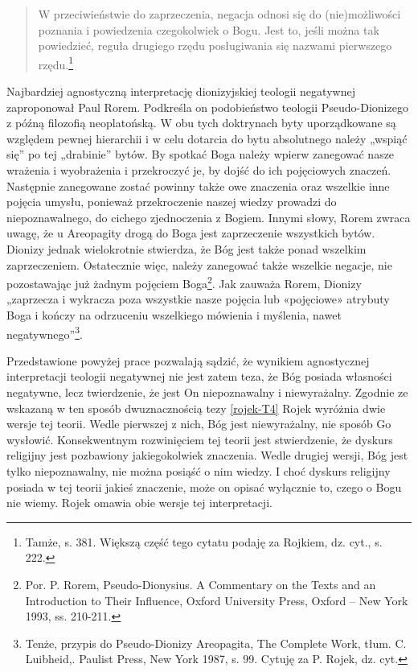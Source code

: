 \begin{quote}
        W przeciwieństwie do zaprzeczenia, negacja odnosi się do (nie)możliwości
poznania i powiedzenia czegokolwiek o Bogu. Jest to, jeśli można tak
powiedzieć, reguła drugiego rzędu posługiwania się nazwami pierwszego
rzędu.\footnote{Tamże, s. 381. Większą część tego cytatu podaję za
Rojkiem, dz. cyt., s. 222. }
\end{quote}






Najbardziej agnostyczną interpretację dionizyjskiej teologii negatywnej
zaproponował Paul Rorem. Podkreśla on podobieństwo teologii
Pseudo-Dionizego z późną filozofią neoplatońską. W obu tych doktrynach
byty uporządkowane są względem pewnej hierarchii i w celu dotarcia do
bytu absolutnego należy „wspiąć się” po tej „drabinie” bytów. By
spotkać Boga należy wpierw zanegować nasze wrażenia i wyobrażenia i
przekroczyć je, by dojść do ich pojęciowych znaczeń. Następnie
zanegowane zostać powinny także owe znaczenia oraz wszelkie inne
pojęcia umysłu, ponieważ przekroczenie naszej wiedzy prowadzi do
niepoznawalnego, do cichego zjednoczenia z Bogiem. Innymi słowy, Rorem
zwraca uwagę, że u Areopagity drogą do Boga jest zaprzeczenie
wszystkich bytów. Dionizy jednak wielokrotnie stwierdza, że Bóg jest
także ponad wszelkim zaprzeczeniem. Ostatecznie więc, należy zanegować
także wszelkie negacje, nie pozostawając już żadnym pojęciem
Boga\footnote{Por. P. Rorem, Pseudo-Dionysius. A Commentary on the
Texts and an Introduction to Their Influence, Oxford University Press,
Oxford -- New York 1993, ss. 210-211. }. Jak zauważa Rorem, Dionizy
„zaprzecza i wykracza poza wszystkie nasze pojęcia lub «pojęciowe»
atrybuty Boga i kończy na odrzuceniu wszelkiego mówienia i myślenia,
nawet negatywnego”\footnote{Tenże, przypis do Pseudo-Dionizy
Areopagita, The Complete Work, tłum. C. Luibheid,. Paulist Press, New
York 1987, s. 99. Cytuję za P. Rojek, dz. cyt. }.

Przedstawione powyżej prace pozwalają sądzić, że wynikiem agnostycznej
interpretacji teologii negatywnej nie jest zatem teza, że Bóg posiada
własności negatywne, lecz twierdzenie, że jest On niepoznawalny i
niewyrażalny. Zgodnie ze wskazaną w ten sposób dwuznacznością tezy \eqref{rojek-T4}
Rojek wyróżnia dwie wersje tej teorii. Wedle pierwszej z nich, Bóg jest
niewyrażalny, nie sposób Go wysłowić. Konsekwentnym rozwinięciem tej
teorii jest stwierdzenie, że dyskurs religijny jest pozbawiony
jakiegokolwiek znaczenia. Wedle drugiej wersji, Bóg jest tylko
niepoznawalny, nie można posiąść o nim wiedzy. I choć dyskurs religijny
posiada w tej teorii jakieś znaczenie, może on opisać wyłącznie to,
czego o Bogu nie wiemy. Rojek omawia obie wersje tej interpretacji.




